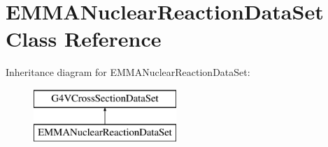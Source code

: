 \hypertarget{classEMMANuclearReactionDataSet}{\section{E\-M\-M\-A\-Nuclear\-Reaction\-Data\-Set Class Reference}
\label{classEMMANuclearReactionDataSet}
}
Inheritance diagram for E\-M\-M\-A\-Nuclear\-Reaction\-Data\-Set\-:\begin{figure}[H]
\begin{center}
\leavevmode
\includegraphics[height=2.000000cm]{classEMMANuclearReactionDataSet}
\end{center}
\end{figure}
